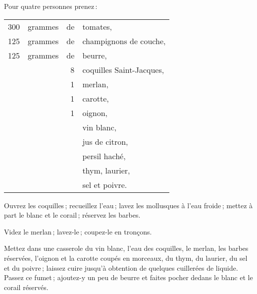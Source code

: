 Pour quatre personnes prenez :

\medskip

\footnotesize
\begin{longtable}{rrrp{16em}}
    300 & grammes & de & tomates,                                                                         \\
    125 & grammes & de & champignons de couche,                                                           \\
    125 & grammes & de & beurre,                                                                          \\
        &         &  8 & coquilles Saint-Jacques,                                                         \\
        &         &  1 & merlan,                                                                          \\
        &         &  1 & carotte,                                                                         \\
        &         &  1 & oignon,                                                                          \\
        &         &    & vin blanc,                                                                       \\
        &         &    & jus de citron,                                                                   \\
        &         &    & persil haché,                                                                    \\
        &         &    & thym, laurier,                                                                   \\
        &         &    & sel et poivre.                                                                   \\
\end{longtable}
\normalsize

Ouvrez les coquilles ; recueillez l'eau ; lavez les mollusques à l'eau froide ;
mettez à part le blanc et le corail ; réservez les barbes.

Videz le merlan ; lavez-le ; coupez-le en tronçons.

Mettez dans une casserole du vin blanc, l'eau des coquilles, le merlan, les
barbes réservées, l'oignon et la carotte coupés en morceaux, du thym, du
laurier, du sel et du poivre ; laissez cuire jusqu'à obtention de quelques
cuillerées de liquide. Passez ce fumet ; ajoutez-y un peu de beurre et faites
pocher dedans le blanc et le corail réservés.

